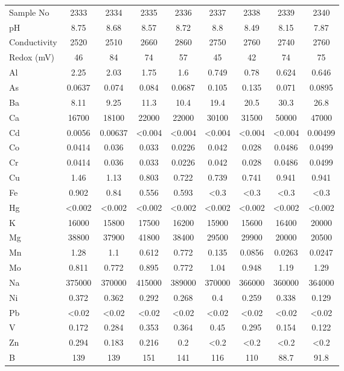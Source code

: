 \documentclass[algorithms,article,submit,pdftex,moreauthors]{Definitions/mdpi}
\begin{document}
\begin{scriptsize}
\begin{center}
\begin{longtable}{@{\extracolsep{\fill}}|p{1.8cm}|cccccccc|@{}}
Sample No & 2333 & 2334 & 2335 & 2336 & 2337 & 2338 & 2339 & 2340 \\
pH & 8.75 & 8.68 & 8.57 & 8.72 & 8.8 & 8.49 & 8.15 & 7.87  \\
Conductivity & 2520 & 2510 & 2660 & 2860 & 2750 & 2760 & 2740 & 2760 \\
Redox (mV) & 46 & 84 & 74 & 57 & 45 & 42 & 74 & 75 \\
Al & 2.25 & 2.03 & 1.75 & 1.6 & 0.749 & 0.78 & 0.624 & 0.646 \\
As & 0.0637 & 0.074 & 0.084 & 0.0687 & 0.105 & 0.135 & 0.071 & 0.0895 \\
Ba & 8.11 & 9.25 & 11.3 & 10.4 & 19.4 & 20.5 & 30.3 & 26.8 \\
Ca & 16700 & 18100 & 22000 & 22000 & 30100 & 31500 & 50000 & 47000 \\
Cd & 0.0056 & 0.00637 & <0.004 & <0.004 & <0.004 & <0.004 & <0.004 & 0.00499  \\
Co & 0.0414 & 0.036 & 0.033 & 0.0226 & 0.042 & 0.028 & 0.0486 & 0.0499 \\
Cr & 0.0414 & 0.036 & 0.033 & 0.0226 & 0.042 & 0.028 & 0.0486 & 0.0499 \\
Cu & 1.46 & 1.13 & 0.803 & 0.722 & 0.739 & 0.741 & 0.941 &  0.941 \\
Fe & 0.902 & 0.84 & 0.556 & 0.593 & <0.3 & <0.3 & <0.3 & <0.3 \\
Hg & <0.002 & <0.002 & <0.002 & <0.002 & <0.002 & <0.002 & <0.002 & <0.002 \\
K & 16000 & 15800 & 17500 & 16200 & 15900 & 15600 & 16400 &  20000 \\
Mg & 38800 & 37900 & 41800 & 38400 & 29500 & 29900 & 20000 & 20500 \\
Mn & 1.28 & 1.1 & 0.612 & 0.772 & 0.135 & 0.0856 & 0.0263 & 0.0247 \\
Mo & 0.811 & 0.772 & 0.895 & 0.772 & 1.04 & 0.948 & 1.19 & 1.29 \\
Na & 375000 & 370000 & 415000 & 389000 & 370000 & 366000 & 360000 & 364000 \\
Ni & 0.372 & 0.362 & 0.292 & 0.268 & 0.4 & 0.259 & 0.338 & 0.129 \\
Pb & <0.02 & <0.02 & <0.02 & <0.02 & <0.02 & <0.02 & <0.02 & <0.02 \\
V & 0.172 & 0.284 & 0.353 & 0.364 & 0.45 & 0.295 & 0.154 &  0.122 \\
Zn & 0.294 & 0.183 & 0.216 & 0.2 & <0.2 & <0.2 & <0.2 & <0.2 \\
B & 139 & 139 & 151 & 141 & 116 & 110 & 88.7 & 91.8  \\

\end{longtable}
\end{center}
\end{scriptsize}
\end{document}
